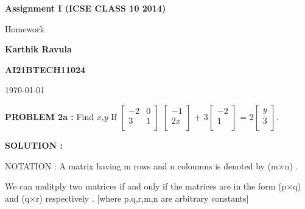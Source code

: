 \documentclass[journal,12pt,twocolumn]{IEEEtran}
\theoremstyle{remark}
\numberwithin{equation}{subsection}
\begin{document}
\begin{titlepage}
    \begin{center}
    
       \vspace*{2cm}
        \huge
        \textbf{Assignment I (ICSE CLASS 10 2014)}
        \vspace{2cm}
        \large
        
        Homework  
        \vspace{1.5cm}
        \Large   
               
        \textbf{Karthik Ravula}
        
        \vspace{0.5cm}      
        \large
            \textbf{AI21BTECH11024}     
            
            
               
       \vspace{4cm}
        \large
        \today
    \end{center}
\end{titlepage}
\newpage
\textbf{PROBLEM 2a :} 
  Find \hspace{0.05cm}$x$,$ y $ \hspace{0.25cm}       
       If $\begin{bmatrix}
        -2 & 0 \\
        3 & 1 \\
      \end{bmatrix}$
      $\begin{bmatrix}
        -1 \\
        2x \\
      \end{bmatrix}$ +
      $3$$\begin{bmatrix}
        -2 \\
         1 \\
      \end{bmatrix}$  \hspace{0.05cm}= 
      \hspace{0.05cm} $2$$\begin{bmatrix}
         y \\
         3 \\
      \end{bmatrix}$.

  \bigskip
  \textbf{SOLUTION : }  
  
  {NOTATION : } A matrix having m rows and n coloumns is denoted by (m$\times$n) .
  
  We can mulitply two matrices if and only if the matrices are in the form (p$\times$q) and (q$\times$r) respectively .
   [where p,q,r,m,n are arbitrary constants]
   
\end{document}
